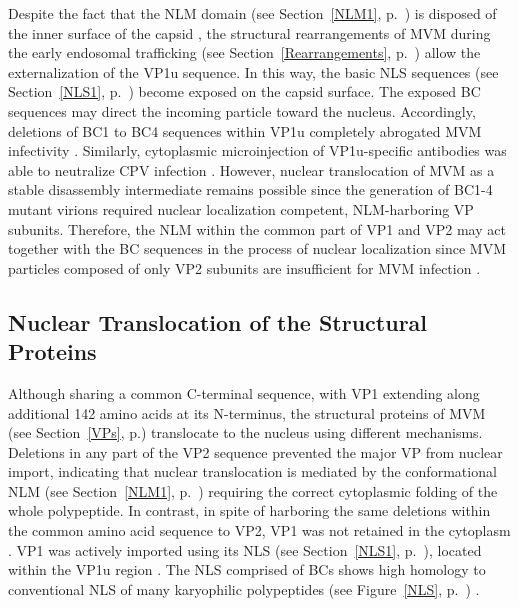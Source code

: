Despite the fact that the NLM domain (see Section~\ref{NLM1}, p.~\pageref{NLM1}) is disposed of the inner surface of the capsid \cite{pmid9817841}, the structural rearrangements of MVM during the early endosomal trafficking (see Section~\ref{Rearrangements}, p.~\pageref{Rearrangements}) allow the externalization of the VP1u sequence. In this way, the basic NLS sequences (see Section~\ref{NLS1}, p.~\pageref{NLS1}) become exposed on the capsid surface. The exposed BC sequences may direct the incoming particle toward the nucleus. Accordingly, deletions of BC1 to BC4 sequences within VP1u completely abrogated MVM infectivity \cite{pmid12072505}. Similarly, cytoplasmic microinjection of VP1u-specific antibodies was able to neutralize CPV infection \cite{pmid11799183}. However, nuclear translocation of MVM as a stable disassembly intermediate remains possible since the generation of BC1-4 mutant virions required nuclear localization competent, NLM-harboring VP subunits. Therefore, the NLM within the common part of VP1 and VP2 may act together with the BC sequences in the process of nuclear localization since MVM particles composed of only VP2 subunits are insufficient for MVM infection \cite{pmid8416366, pmid12072505}.   



\subsection{Nuclear Translocation of the Structural Proteins}
\label{Struc Transloc}
Although sharing a common C-terminal sequence, with VP1 extending along additional 142 amino acids at its N-terminus, the structural proteins of MVM (see Section~\ref{VPs}, p.\pageref{VPs}) translocate to the nucleus using different mechanisms. Deletions in any part of the VP2 sequence prevented the major VP from nuclear import, indicating that nuclear translocation is mediated by the conformational NLM (see Section~\ref{NLM1}, p.~\pageref{NLM1}) requiring the correct cytoplasmic folding of the whole polypeptide. In contrast, in spite of harboring the same deletions within the common amino acid sequence to VP2, VP1 was not retained in the cytoplasm \cite{pmid10729155}. VP1 was actively imported using its NLS (see Section~\ref{NLS1}, p.~\pageref{NLS1}), located within the VP1u region \cite{pmid12072505}. The NLS comprised of BCs shows high homology to conventional NLS of many karyophilic polypeptides (see Figure~\ref{NLS}, p.~\pageref{NLS}) \cite{pmid2004116, pmid6088992}. 

